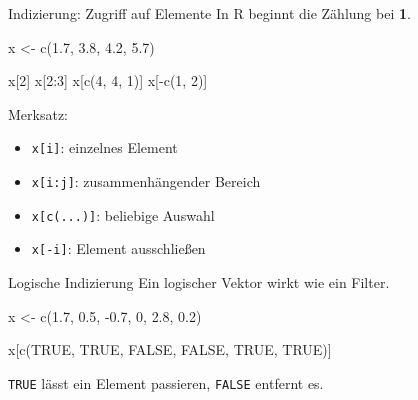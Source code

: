 \documentclass[
  10pt,
  ignorenonframetext,
  aspectratio=169,
]{beamer}
\newenvironment{Shaded}{}{}
\newcommand{\ConstantTok}[1]{\textcolor[rgb]{0.53,0.00,0.00}{#1}}
\newcommand{\DecValTok}[1]{\textcolor[rgb]{0.25,0.63,0.44}{#1}}
\newcommand{\FloatTok}[1]{\textcolor[rgb]{0.25,0.63,0.44}{#1}}
\newcommand{\FunctionTok}[1]{\textcolor[rgb]{0.02,0.16,0.49}{#1}}
\newcommand{\NormalTok}[1]{#1}
\newcommand{\OtherTok}[1]{\textcolor[rgb]{0.00,0.44,0.13}{#1}}
\newcommand{\SpecialCharTok}[1]{\textcolor[rgb]{0.25,0.44,0.63}{#1}}
\providecommand{\tightlist}{%
  \setlength{\itemsep}{0pt}\setlength{\parskip}{0pt}}
\begin{document}
\begin{frame}[fragile]{Indizierung: Zugriff auf Elemente}
\label{indizierung-zugriff-auf-elemente}
In R beginnt die Zählung bei \textbf{1}.

\begin{Shaded}
\begin{Highlighting}[]
\NormalTok{x }\OtherTok{\textless{}{-}} \FunctionTok{c}\NormalTok{(}\FloatTok{1.7}\NormalTok{, }\FloatTok{3.8}\NormalTok{, }\FloatTok{4.2}\NormalTok{, }\FloatTok{5.7}\NormalTok{)}

\NormalTok{x[}\DecValTok{2}\NormalTok{]}
\NormalTok{x[}\DecValTok{2}\SpecialCharTok{:}\DecValTok{3}\NormalTok{]}
\NormalTok{x[}\FunctionTok{c}\NormalTok{(}\DecValTok{4}\NormalTok{, }\DecValTok{4}\NormalTok{, }\DecValTok{1}\NormalTok{)]}
\NormalTok{x[}\SpecialCharTok{{-}}\FunctionTok{c}\NormalTok{(}\DecValTok{1}\NormalTok{, }\DecValTok{2}\NormalTok{)]}
\end{Highlighting}
\end{Shaded}

Merksatz:

\begin{itemize}
\tightlist
\item
  \texttt{x{[}i{]}}: einzelnes Element
\item
  \texttt{x{[}i:j{]}}: zusammenhängender Bereich
\item
  \texttt{x{[}c(...){]}}: beliebige Auswahl
\item
  \texttt{x{[}-i{]}}: Element ausschließen
\end{itemize}
\end{frame}

\begin{frame}[fragile]{Logische Indizierung}
\label{logische-indizierung}
Ein logischer Vektor wirkt wie ein Filter.

\begin{Shaded}
\begin{Highlighting}[]
\NormalTok{x }\OtherTok{\textless{}{-}} \FunctionTok{c}\NormalTok{(}\FloatTok{1.7}\NormalTok{, }\FloatTok{0.5}\NormalTok{, }\SpecialCharTok{{-}}\FloatTok{0.7}\NormalTok{, }\DecValTok{0}\NormalTok{, }\FloatTok{2.8}\NormalTok{, }\FloatTok{0.2}\NormalTok{)}

\NormalTok{x[}\FunctionTok{c}\NormalTok{(}\ConstantTok{TRUE}\NormalTok{, }\ConstantTok{TRUE}\NormalTok{, }\ConstantTok{FALSE}\NormalTok{, }\ConstantTok{FALSE}\NormalTok{, }\ConstantTok{TRUE}\NormalTok{, }\ConstantTok{TRUE}\NormalTok{)]}
\end{Highlighting}
\end{Shaded}

\texttt{TRUE} lässt ein Element passieren, \texttt{FALSE} entfernt es.
\end{frame}
\end{document}
